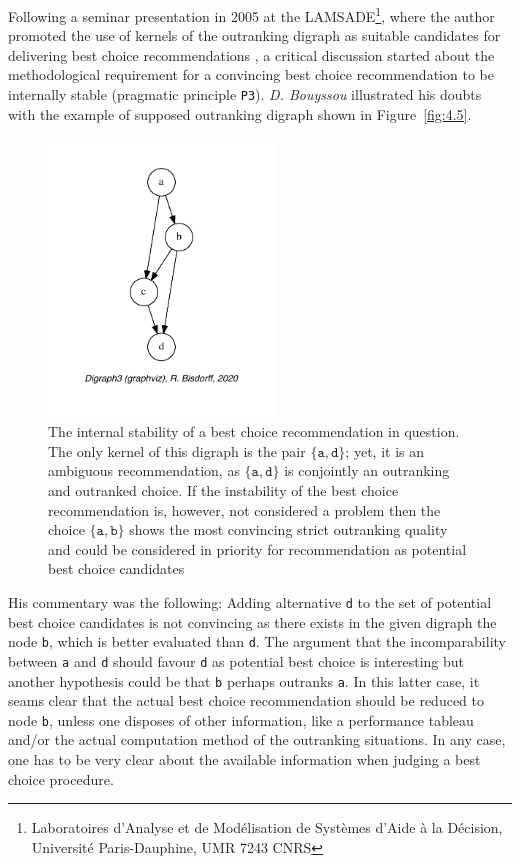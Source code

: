Following a seminar presentation in 2005 at the LAMSADE\footnote{Laboratoires d'Analyse et de Modélisation de Systèmes d'Aide à la Décision, Université Paris-Dauphine, UMR 7243 CNRS}, where the author promoted the use of kernels of the outranking digraph as suitable candidates for delivering best choice recommendations \citep{BIS-2005}, a critical discussion started about the methodological requirement for a convincing best choice recommendation to be internally stable (pragmatic principle \texttt{P3}). \emph{D. Bouyssou} illustrated his doubts with the example of supposed outranking digraph shown in Figure~\vref{fig:4.5}.
\begin{figure}[ht]
\sidecaption[t]
\includegraphics[width=6cm]{Figures/4-5-bouyssou11Oct05crisp.pdf}
\caption{The internal stability of a best choice recommendation in question. The only kernel of this digraph is the pair $\{\mathtt{a},\mathtt{d}\}$; yet, it is an ambiguous recommendation, as $\{\mathtt{a},\mathtt{d}\}$ is conjointly an outranking and outranked choice. If the instability of the best choice recommendation is, however, not considered a problem then the choice $\{\mathtt{a},\mathtt{b}\}$ shows the most convincing strict outranking quality and could be considered in priority for recommendation as potential best choice candidates}
\label{fig:4.5}       %
\end{figure}

His commentary was the following: Adding alternative \texttt{d} to the set of potential best choice candidates is not convincing as there exists in the given digraph the node \texttt{b}, which is better evaluated than \texttt{d}. The argument that the incomparability between \texttt{a} and \texttt{d} should favour \texttt{d} as potential best choice is interesting but another hypothesis could be that \texttt{b} perhaps outranks \texttt{a}. In this latter case, it seams clear that the actual best choice recommendation should be reduced to node \texttt{b}, unless one disposes of other information, like a performance tableau and/or the actual computation method of the outranking situations. In any case, one has to be very clear about the available information when judging a best choice procedure.

